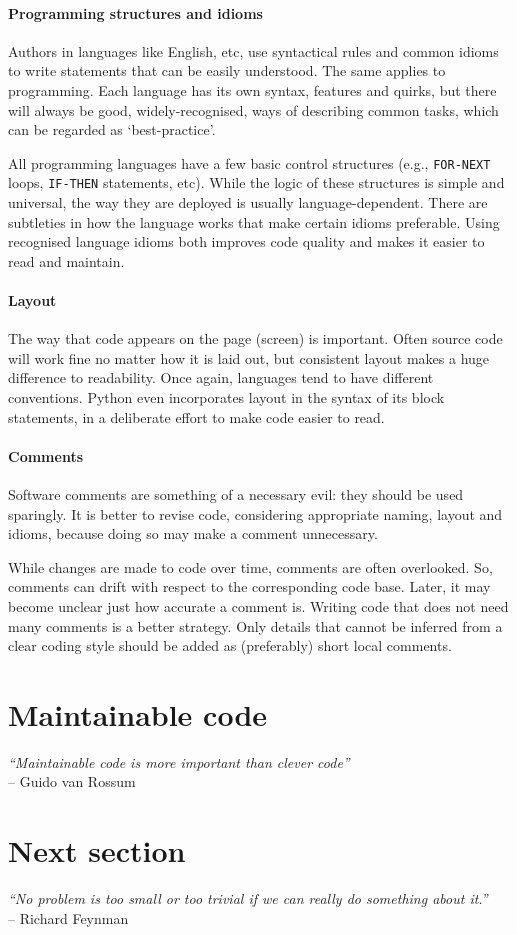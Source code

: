 \paragraph{Programming structures and idioms} Authors in languages like English, etc, use syntactical rules and common idioms to write statements that can be easily understood. The same applies to programming. Each language has its own syntax, features and quirks, but there will always be good, widely-recognised, ways of describing common tasks, which can be regarded as `best-practice'.

All programming languages have a few basic control structures (e.g., \texttt{FOR-NEXT} loops, \texttt{IF-THEN} statements, etc). While the logic of these structures is simple and universal, the way they are deployed is usually language-dependent. There are subtleties in how the language works that make certain idioms preferable. Using recognised language idioms both improves code quality and makes it easier to read and maintain. 

  

\paragraph{Layout} The way that code appears on the page (screen) is important. Often source code will work fine no matter how it is laid out, but consistent layout makes a huge difference to readability. Once again, languages tend to have different conventions. Python even incorporates layout in the syntax of its block statements, in a deliberate effort to make code easier to read.

\paragraph{Comments} Software comments are something of a necessary evil: they should be used sparingly. It is better to revise code, considering appropriate naming, layout and idioms, because doing so may make a comment unnecessary.

While changes are made to code over time, comments are often overlooked. So, comments can drift with respect to the corresponding code base. Later, it may become unclear just how accurate a comment is. Writing code that does not need many comments is a better strategy. Only details that cannot be inferred from a clear coding style should be added as (preferably) short local comments.

\section{Maintainable code}
\begin{flushright}
\textit{``Maintainable code is more important than clever code''} \\
-- Guido van Rossum 
\end{flushright}



\section{Next section}
\begin{flushright}
\textit{“No problem is too small or too trivial if we can really do something about it.”} \\
-- Richard Feynman 
\end{flushright}

